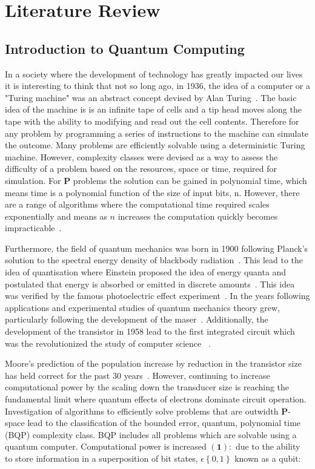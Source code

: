 \chapter{\label{sec:casestudy}Literature Review}
\section{Introduction to Quantum Computing}
In a society where the development of technology has greatly impacted our lives it is interesting to think that not so long ago, in 1936, the idea of a computer or a "Turing machine" was an abstract concept devised by Alan Turing~\citep{Turing1937OnEntscheidungsproblem,Nielsen2010QuantumInformation}. The basic idea of the machine is is an infinite tape of cells and a tip head moves along the tape with the ability to modifying and read out the cell contents. Therefore for any problem by programming a series of instructions to the machine can simulate the outcome. Many problems are efficiently solvable using a deterministic Turing machine. However, complexity classes were devised as a way to assess the difficulty of a problem based on the resources, space or time, required for simulation. For $\bm{P}$ problems the solution can be gained in polynomial time, which means time is a polynomial function of the size of input bits, n. However, there are a range of algorithms where the computational time required scales exponentially and means as $n$ increases the computation quickly becomes impracticable~\citep{talbot_welsh_2006}.

Furthermore, the field of quantum mechanics was born in 1900 following Planck's solution to the spectral energy density of blackbody radiation~\citep{Maxplanck}. This lead to the idea of quantisation where Einstein proposed the idea of energy quanta and postulated that energy is absorbed or emitted in discrete amounts~\citep{doi:10.1002/andp.19053220607}. This idea was verified by the famous photoelectric effect experiment~\citep{0143-0807-32-4-018}. In the years following applications and experimental studies of quantum mechanics theory grew, particularly following the development of the maser~\citep{PhysRev.99.1264}. Additionally, the development of the transistor in 1958 lead to the first integrated circuit which was the revolutionized the study of computer science ~\citep{Arns1998TheTransistor}. 

Moore's prediction of the population increase by reduction in the transistor size has held correct for the past 30 years~\citep{Moore1965CramingCircuits}. However, continuing to increase computational power by the scaling down the transducer size is reaching the fundamental limit where quantum effects of electrons dominate circuit operation. Investigation of algorithms to efficiently solve problems that are outwidth $\bm{P}$-space lead to the classification of the bounded error, quantum, polynomial time (BQP) complexity class. BQP includes all problems which are solvable using a quantum computer. Computational power is increased $\bm{(1)}:$ due to the ability to store information in a superposition of bit states, $\epsilon \left \{ 0,1 \right \}$ known as a qubit: 

